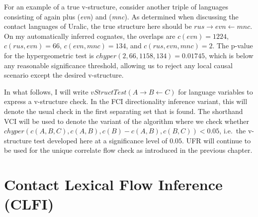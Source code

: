 For an example of a true v-structure, consider another triple of languages consisting of again  plus  (\textit{evn}) and  (\textit{mnc}). As determined when discussing the contact languages of Uralic, the true structure here should be $rus \rightarrow evn \leftarrow mnc$. On my automatically inferred cognates, the overlaps are $c(evn) = 1224$, $c(rus,evn) = 66$, $c(evn,mnc) = 134$, and $c(rus,evn,mnc) = 2$. The p-value for the hypergeometric test is $chyper(2, 66, 1158, 134) = 0.01745$, which is below any reasonable significance threshold, allowing us to reject any local causal scenario except the desired v-structure.

In what follows, I will write $vStructTest(A \rightarrow B \leftarrow C)$ for language variables to express a v-structure check. In the FCI directionality inference variant, this will denote the usual check in the first separating set that is found. The shorthand VCI will be used to denote the variant of the algorithm where we check whether $chyper(c(A,B,C),c(A,B),c(B)-c(A,B),c(B,C)) < 0.05$, i.e.\ the v-structure test developed here at a significance level of $0.05$. UFR will continue to be used for the unique correlate flow check as introduced in the previous chapter.

\section{Contact Lexical Flow Inference (CLFI)}\label{sec:7.5}

